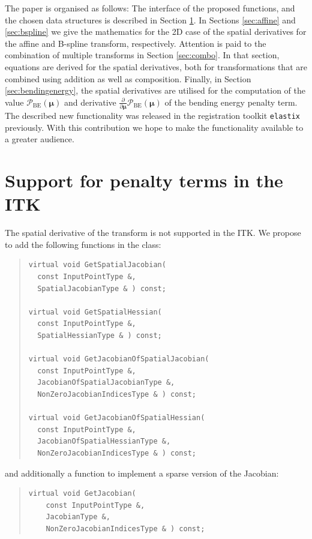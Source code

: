 \documentclass{InsightArticle}
\newcommand{\vmu}{\bm{\mu}}
\newcommand{\D}[2]{\frac{\partial #1}{\partial #2}}
\newcommand{\elastix}{\texttt{elastix}}
\begin{document}
The paper is organised as follows: The interface of the proposed
functions, and the chosen data structures is described in Section
\ref{sec:interface}. In Sections \ref{sec:affine} and
\ref{sec:bspline} we give the mathematics for the 2D case of the
spatial derivatives for the affine and B-spline transform,
respectively. Attention is paid to the combination of multiple
transforms in Section \ref{sec:combo}. In that section, equations
are derived for the spatial derivatives, both for transformations
that are combined using addition as well as composition. Finally, in
Section \ref{sec:bendingenergy}, the spatial derivatives are
utilised for the computation of the value
$\mathcal{P}_{\mathrm{BE}}(\vmu)$ and derivative $\D{}{\vmu}
\mathcal{P}_{\mathrm{BE}}(\vmu)$ of the bending energy penalty term.
The described new functionality was released in the registration
toolkit \elastix\ \cite{KleinStaring:2010} previously. With this
contribution we hope to make the functionality available to a
greater audience.


\section{Support for penalty terms in the ITK}\label{sec:interface}

The spatial derivative of the transform is not supported in the ITK.
We propose to add the following functions in the 
class:
\begin{quote}
\begin{verbatim}
virtual void GetSpatialJacobian(
  const InputPointType &,
  SpatialJacobianType & ) const;

virtual void GetSpatialHessian(
  const InputPointType &,
  SpatialHessianType & ) const;

virtual void GetJacobianOfSpatialJacobian(
  const InputPointType &,
  JacobianOfSpatialJacobianType &,
  NonZeroJacobianIndicesType & ) const;

virtual void GetJacobianOfSpatialHessian(
  const InputPointType &,
  JacobianOfSpatialHessianType &,
  NonZeroJacobianIndicesType & ) const;
\end{verbatim}
\end{quote}
and additionally a function to implement a sparse version of the
Jacobian:
\begin{quote}
\begin{verbatim}
virtual void GetJacobian(
    const InputPointType &,
    JacobianType &,
    NonZeroJacobianIndicesType & ) const;
\end{verbatim}
\end{quote}
\end{document}
